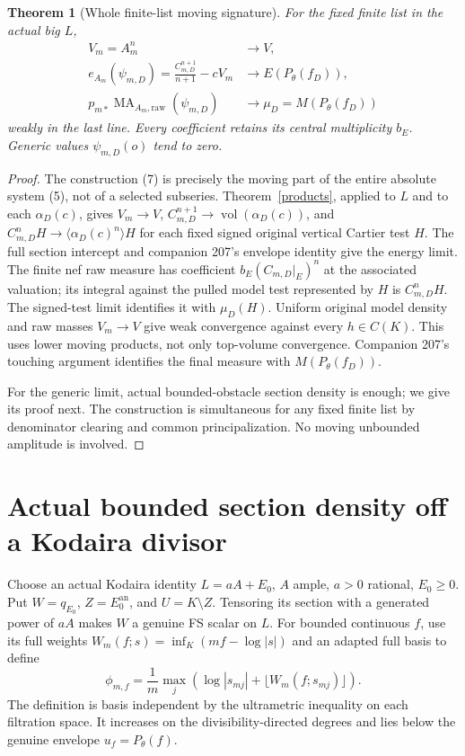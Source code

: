 \documentclass[11pt]{article}
\newtheorem{theorem}{Theorem}
\newcommand{\vol}{\operatorname{vol}}
\newcommand{\MA}{\operatorname{MA}}
\begin{document}
\begin{theorem}[Whole finite-list moving signature]\label{moving}
For the fixed finite list in the actual big $L$,
\[
\begin{split}
 V_m=A_m^n&\longrightarrow V,\\
 e_{A_m}(\psi_{m,D})
   =\frac{C_{m,D}^{n+1}}{n+1}-cV_m
      &\longrightarrow E(P_\theta(f_D)),\\
 p_{m*}\MA_{A_m,\mathrm{raw}}(\psi_{m,D})
      &\longrightarrow\mu_D=M(P_\theta(f_D))
\end{split}                                             \tag{9}
\]
weakly in the last line. Every coefficient retains its central
multiplicity $b_E$. Generic values $\psi_{m,D}(o)$ tend to zero.
\end{theorem}
\begin{proof}
The construction (7) is precisely the moving part of the entire
absolute system (5), not of a selected subseries.
Theorem~\ref{products}, applied to $L$ and to each $\alpha_D(c)$,
gives $V_m\to V$, $C_{m,D}^{n+1}\to\vol(\alpha_D(c))$,
and $C_{m,D}^nH\to\langle\alpha_D(c)^n\rangle H$
for each fixed signed original vertical Cartier test $H$.
The full section intercept and companion 207's envelope identity
give the energy limit.
The finite nef raw measure has coefficient
$b_E(C_{m,D}|_E)^n$ at the associated valuation; its integral
against the pulled model test represented by $H$ is $C_{m,D}^nH$.
The signed-test limit identifies it with $\mu_D(H)$.
Uniform original model density and raw masses $V_m\to V$
give weak convergence against every $h\in C(K)$.
This uses lower moving products, not only top-volume convergence.
Companion 207's touching argument identifies the final measure with
$M(P_\theta(f_D))$.

For the generic limit, actual bounded-obstacle section density
is enough; we give its proof next. The construction is simultaneous
for any fixed finite list by denominator clearing and common
principalization. No moving unbounded amplitude is involved.
\end{proof}

\section{Actual bounded section density off a Kodaira divisor}
Choose an actual Kodaira identity $L=aA+E_0$, $A$ ample,
$a>0$ rational, $E_0\geq0$. Put $W=q_{E_0}$, $Z=E_0^{\mathrm{an}}$,
and $U=K\setminus Z$. Tensoring its section with a generated
power of $aA$ makes $W$ a genuine FS scalar on $L$.
For bounded continuous $f$, use its full weights
$W_m(f;s)=\inf_K(mf-\log|s|)$ and an adapted full basis to define
\[
 \phi_{m,f}=\frac1m\max_j
                 (\log|s_{mj}|+\lfloor W_m(f;s_{mj})\rfloor).
                                                        \tag{10}
\]
The definition is basis independent by the ultrametric inequality
on each filtration space. It increases on the divisibility-directed
degrees and lies below the genuine envelope $u_f=P_\theta(f)$.
\end{document}
